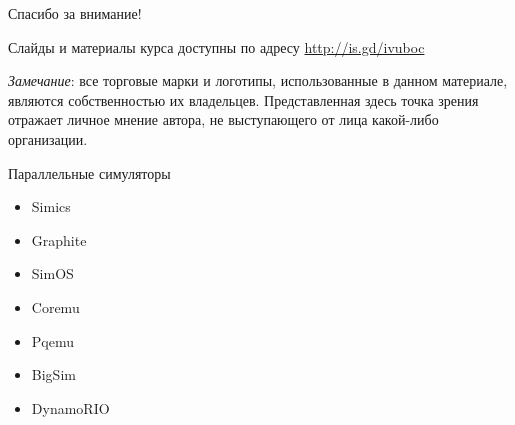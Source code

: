 \documentclass{beamer}
\begin{document}
\begin{frame}

{\huge{Спасибо за внимание!}\par}

\vfill

Слайды и материалы курса доступны по адресу \url{http://is.gd/ivuboc} %

\vfill

\tiny{\textit{Замечание}: все торговые марки и логотипы, использованные в данном материале, являются собственностью их владельцев. Представленная здесь точка зрения отражает личное мнение автора, не выступающего от лица какой-либо организации.}

\end{frame}


\begin{frame}{Параллельные симуляторы}
\begin{itemize}
    \item Simics
    \item Graphite
    \item SimOS
    \item Coremu
    \item Pqemu
    \item BigSim
    \item DynamoRIO
\end{itemize}
\end{frame}
\end{document}
